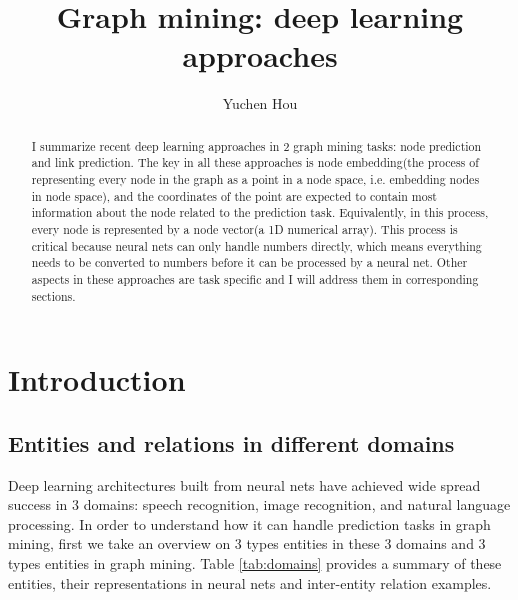\documentclass{article}
\begin{document}
\lstset{language=python, tabsize=4}
\title{Graph mining: deep learning approaches}
\author{Yuchen Hou}
\maketitle

\begin{abstract}
	I summarize recent deep learning approaches in 2 graph mining tasks: node prediction and link prediction. The key in all these approaches is node embedding(the process of representing every node in the graph as a point in a node space, i.e. embedding nodes in node space), and the coordinates of the point are expected to contain most information about the node related to the prediction task. Equivalently, in this process, every node is represented by a node vector(a 1D numerical array). This process is critical because neural nets can only handle numbers directly, which means everything needs to be converted to numbers before it can be processed by a neural net. Other aspects in these approaches are task specific and I will address them in corresponding sections.
\end{abstract}

\section{Introduction}

\subsection{Entities and relations in different domains}
Deep learning architectures built from neural nets have achieved wide spread success in 3 domains: speech recognition, image recognition, and natural language processing. In order to understand how it can handle prediction tasks in graph mining, first we take an overview on 3 types entities in these 3 domains and 3 types entities in graph mining. Table \ref{tab:domains} provides a summary of these entities, their representations in neural nets and inter-entity relation examples.
\end{document}
